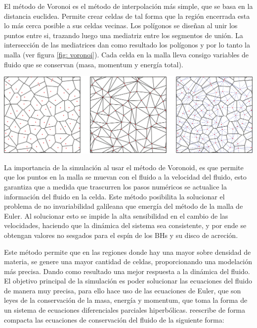 El método de Voronoi es el método de interpolación más simple, que se basa en la distancia euclidea. Permite crear celdas de tal forma que la región encerrada esta lo más cerca posible a sus celdas vecinas. Los polígonos se diseñan al unir los puntos entre si, trazando luego una mediatriz entre los segmentos de unión. La intersección de las mediatrices dan como resultado los polígonos y por lo tanto la malla (ver figura \ref{fig: voronoi}). Cada celda en la malla lleva consigo variables de fluido que se conservan (masa, momentum y energía total).
%
\begin{center}
\includegraphics[scale=.35]{./figures/5_Algoritmo_Modelacion/voronoi.png}
\label{fig: voronoi}
\end{center}
%
La importancia de la simulación al usar el método de Voronoid, es que permite que los puntos en la malla se muevan con el fluido a la velocidad del fluido, esto garantiza que a medida que trascurren los pasos numéricos se actualice la información del fluido en la celda. Este método posibilita la solucionar el problema de no invariabilidad galileana que emergía del método de la malla de Euler. Al solucionar esto se impide la alta sensibilidad en el cambio de las velocidades, haciendo que la dinámica del sistema sea consistente, y por ende se obtengan valores no sesgados para  el espín de los BHs y su disco de acreción.  

Este método permite que en las regiones donde hay una mayor sobre densidad de materia, se genere una mayor cantidad de celdas, proporcionando una modelación más precisa. Dando como resultado una mejor respuesta a la dinámica del fluido.
El objetivo principal de la simulación es poder solucionar las ecuaciones del fluido de manera muy precisa, para ello hace uso de las ecuaciones de Euler, que son leyes de la conservación de la masa, energía y momentum, que toma la forma de un sistema de ecuaciones diferenciales parciales hiperbólicas. \cite{springel2010} reescribe de forma compacta las ecuaciones de conservación del fluido de la siguiente forma:

